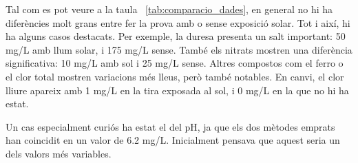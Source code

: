 \begin{table}[p]
\centering
{}
\caption{Resultats del primer experiment}
\label{tab:comparacio_dades}
\end{table}

Tal com es pot veure a la taula~ \ref{tab:comparacio_dades}, en general no hi ha diferències molt grans entre fer la prova amb o sense exposició solar. Tot i així, hi ha alguns casos destacats. Per exemple, la duresa presenta un salt important: 50 mg/L amb llum solar, i 175 mg/L sense. També els nitrats mostren una diferència significativa: 10 mg/L amb sol i 25 mg/L sense. Altres compostos com el ferro o el clor total mostren variacions més lleus, però també notables. En canvi, el clor lliure apareix amb 1 mg/L en la tira exposada al sol, i 0 mg/L en la que no hi ha estat.

Un cas especialment curiós ha estat el del pH, ja que els dos mètodes emprats han coincidit en un valor de 6.2 mg/L. Inicialment pensava que aquest seria un dels valors més variables.

